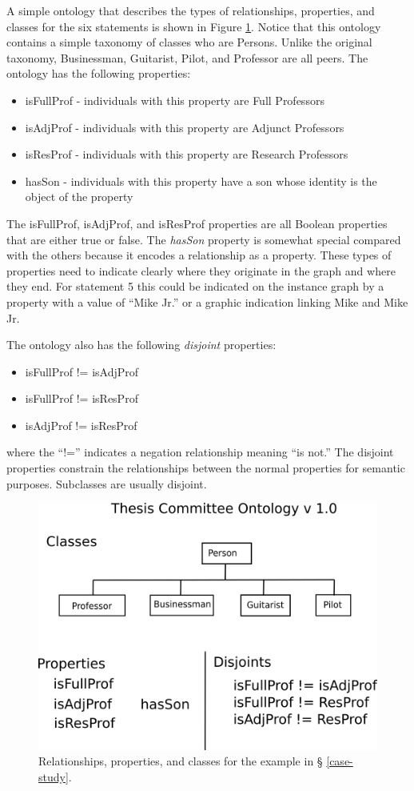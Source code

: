 A simple ontology that describes the types of relationships, properties, and
classes for the six statements is shown in Figure \ref{ont-classes}.
Notice that this ontology contains a simple taxonomy of classes who are
Persons. Unlike the original taxonomy, Businessman, Guitarist, Pilot,
and Professor are all peers. The ontology has the following properties:
\begin{itemize}
  \item isFullProf - individuals with this property are Full Professors
  \item isAdjProf - individuals with this property are Adjunct Professors
  \item isResProf - individuals with this property are Research Professors
  \item hasSon - individuals with this property have a son whose identity is the
  object of the property
\end{itemize} 
The isFullProf, isAdjProf, and isResProf properties are all Boolean properties
that are either true or false. The \textit{hasSon} property is somewhat special
compared with the others because it encodes a relationship as a property. These
types of properties need to indicate clearly where they originate in the graph
and where they end. For statement 5 this could be indicated on the instance
graph by a property with a value of ``Mike Jr.'' or a graphic indication linking
Mike and Mike Jr.

The ontology also has the following \textit{disjoint} properties:
\begin{itemize}
  \item isFullProf != isAdjProf
  \item isFullProf != isResProf
  \item isAdjProf != isResProf
\end{itemize}
where the ``!='' indicates a negation relationship meaning ``is not.'' The
disjoint properties constrain the relationships between the normal properties
for semantic purposes. Subclasses are usually disjoint.

\begin{figure}[htbp]
\centering
\includegraphics[width=\textwidth]{figures/tc-ont-classes.png}
\caption{Relationships, properties, and classes for the example in \S
\ref{case-study}.}
\label{ont-classes}
\end{figure}

